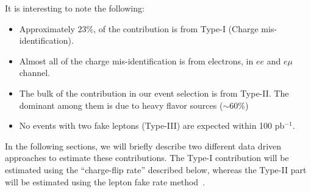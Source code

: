 It is interesting to note the following:
\begin{itemize}
\item Approximately $23 \%$, of the contribution is from Type-I (Charge mis-identification).
\item Almost all of the charge mis-identification is from electrons, in $ee$ and $e\mu$ channel.
\item The bulk of the \ttbar contribution in our event selection is from Type-II. The dominant among them 
is due to heavy flavor sources ($\sim 60 \%$)
\item No events with two fake leptons (Type-III) are expected within 100 pb$^{-1}$.
\end{itemize} 

In the following sections, we will briefly describe two different data driven approaches to 
estimate these contributions. The Type-I contribution will be estimated using the ``charge-flip rate'' described below, 
whereas the Type-II part will be estimated using the lepton fake rate method~\cite{fakelep}.



